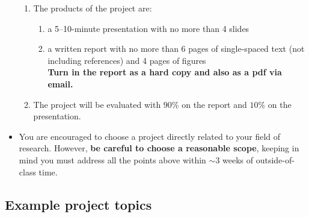 \documentclass[11pt,titlepage,fleqn]{article}
\begin{document}
\begin{itemize}
\begin{enumerate}
\item The products of the project are:
%
\begin{enumerate}
\item a 5--10-minute presentation with no more than 4 slides
\item a written report with no more than 6 pages of single-spaced text (not including references) and 4 pages of figures \\
{\bf Turn in the report as a hard copy and also as a pdf via email.}
\end{enumerate}

\item The project will be evaluated with $90\%$ on the report and $10\%$ on the presentation.

\end{enumerate}

\item You are encouraged to choose a project directly related to your field of research. However, {\bf be careful to choose a reasonable scope}, keeping in mind you must address all the points above within $\sim$3 weeks of outside-of-class time.

\end{itemize}


\pagebreak
\subsection*{Example project topics}
\end{document}
